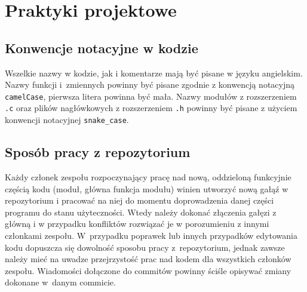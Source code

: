 \documentclass{article}
\begin{document}
\section{Praktyki projektowe}

\subsection{Konwencje notacyjne w kodzie}
Wszelkie nazwy w kodzie, jak i komentarze mają być pisane w języku angielskim. Nazwy funkcji i~zmiennych powinny być pisane zgodnie z konwencją notacyjną \texttt{camelCase}, pierwsza litera powinna być mała. Nazwy modułów z rozszerzeniem \texttt{.c} oraz plików nagłówkowych z rozszerzeniem \texttt{.h} powinny być pisane z użyciem konwencji notacyjnej \texttt{snake\_case}.

\subsection{Sposób pracy z repozytorium}
Każdy członek zespołu rozpoczynający pracę nad nową, oddzieloną funkcyjnie częścią kodu (moduł, główna funkcja modułu) winien utworzyć nową gałąź w repozytorium i pracować na niej do momentu doprowadzenia danej części programu do stanu użyteczności. Wtedy należy dokonać złączenia gałęzi z~
główną i w przypadku konfliktów rozwiązać je w porozumieniu z innymi członkami zespołu. W~przypadku poprawek lub innych przypadków edytowania kodu dopuszcza się dowolność sposobu pracy z~repozytorium, jednak zawsze należy mieć na uwadze przejrzystość prac nad kodem dla wszystkich członków zespołu. Wiadomości dołączone do commitów powinny ściśle opisywać zmiany dokonane w~danym commicie.
\end{document}
